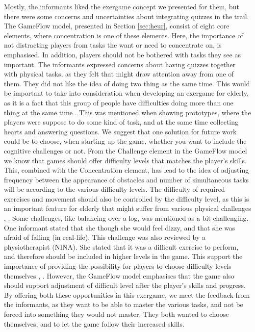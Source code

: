 Mostly, the informants liked the exergame concept we presented for them, but there were some concerns and uncertainties about integrating quizzes in the trail. The GameFlow model, presented in Section \ref{sec:heur}, consist of eight core elements, where concentration is one of these elements. Here, the importance of not distracting players from tasks the want or need to concentrate on, is emphasised. In addition, players should not be bothered with tasks they see as important. The informants expressed concerns about having quizzes together with physical tasks, as they felt that might draw attention away from one of them. They did not like the idea of doing two thing as the same time. This would be important to take into consideration when developing an exergame for elderly, as it is a fact that this group of people have difficulties doing more than one thing at the same time \cite{bruin}. This was mentioned when showing prototypes, where the players were suppose to do some kind of task, and at the same time collecting hearts and answering questions. We suggest that one solution for future work could be to choose, when starting up the game, whether you want to include the cognitive challenges or not. From the Challenge element in the GameFlow model we know that games should offer difficulty levels that matches the player's skills. This, combined with the Concentration element, has lead to the idea of adjusting frequency between the appearance of obstacles and number of simultaneous tasks will be according to the various difficulty levels. The difficulty of required exercises and movement should also be controlled by the difficulty level, as this is an important feature for elderly that might suffer from various physical challenges \cite{gregor}, \cite{gerling1}. Some challenges, like balancing over a log, was mentioned as a bit challenging. One informant stated that she though she would feel dizzy, and that she was afraid of falling (in real-life). This challenge was also reviewed by a physiotherapist (NINA). She stated that it was a difficult exercise to perform, and therefore should be included in higher levels in the game. This support the importance of providing the possibility for players to choose difficulty levels themselves \cite{gregor}, \cite{gerling1}. However, the GameFlow model emphasises that the game also should support adjustment of difficult level after the player's skills and progress. By offering both these opportunities in this exergame, we meet the feedback from the informants, as they want to be able to master the various tasks, and not be forced into something they would not master. They both wanted to choose themselves, and to let the game follow their increased skills. 


